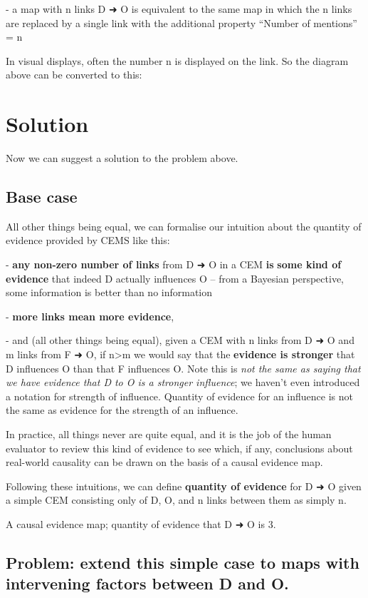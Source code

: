 \documentclass[
]{book}
\begin{document}
- a map with n links D ➜ O is equivalent to the same map in which the n links are replaced by a single link with the additional property ``Number of mentions'' = n

In visual displays, often the number n is displayed on the link. So the diagram above can be converted to this:

\hypertarget{solution}{%
\section{Solution}\label{solution}}

Now we can suggest a solution to the problem above.

\hypertarget{base-case}{%
\subsection{Base case}\label{base-case}}

All other things being equal, we can formalise our intuition about the quantity of evidence provided by CEMS like this:

- \textbf{any non-zero number of links} from D ➜ O in a CEM \textbf{is} \textbf{some kind of evidence} that indeed D actually influences O -- from a Bayesian perspective, some information is better than no information

- \textbf{more links mean more evidence},

- and (all other things being equal), given a CEM with n links from D ➜ O and m links from F ➜ O, if n\textgreater m we would say that the \textbf{evidence is stronger} that D influences O than that F influences O. Note this is \emph{not the same as saying that we have evidence that D to O is a stronger influence}; we haven't even introduced a notation for strength of influence. Quantity of evidence for an influence is not the same as evidence for the strength of an influence.

In practice, all things never are quite equal, and it is the job of the human evaluator to review this kind of evidence to see which, if any, conclusions about real-world causality can be drawn on the basis of a causal evidence map.

Following these intuitions, we can define \textbf{quantity of evidence} for D ➜ O given a simple CEM consisting only of D, O, and n links between them as simply n.

A causal evidence map; quantity of evidence that D ➜ O is 3.

\hypertarget{problem-extend-this-simple-case-to-maps-with-intervening-factors-between-d-and-o.}{%
\subsection{Problem: extend this simple case to maps with intervening factors between D and O.}\label{problem-extend-this-simple-case-to-maps-with-intervening-factors-between-d-and-o.}}
\end{document}
